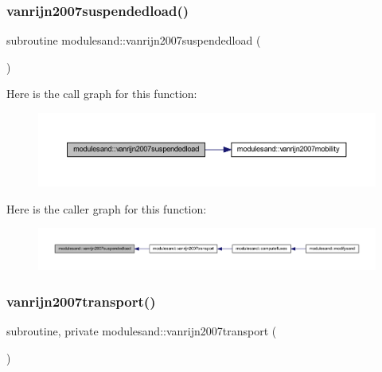 \subsubsection{\texorpdfstring{vanrijn2007suspendedload()}{vanrijn2007suspendedload()}}
{\footnotesize\ttfamily subroutine modulesand\+::vanrijn2007suspendedload (\begin{DoxyParamCaption}{ }\end{DoxyParamCaption})\hspace{0.3cm}{\ttfamily [private]}}

Here is the call graph for this function\+:\nopagebreak
\begin{figure}[H]
\begin{center}
\leavevmode
\includegraphics[width=350pt]{namespacemodulesand_ad4f562b0c7304b99b372a946d8cab5b1_cgraph}
\end{center}
\end{figure}
Here is the caller graph for this function\+:\nopagebreak
\begin{figure}[H]
\begin{center}
\leavevmode
\includegraphics[width=350pt]{namespacemodulesand_ad4f562b0c7304b99b372a946d8cab5b1_icgraph}
\end{center}
\end{figure}
\mbox{\label{namespacemodulesand_a86c23492690f1972adf61f7f2b36f027}} 
\subsubsection{\texorpdfstring{vanrijn2007transport()}{vanrijn2007transport()}}
{\footnotesize\ttfamily subroutine, private modulesand\+::vanrijn2007transport (\begin{DoxyParamCaption}{ }\end{DoxyParamCaption})\hspace{0.3cm}{\ttfamily [private]}}

